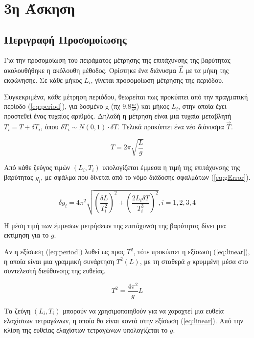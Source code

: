 \documentclass[assignment1.tex]{subfiles}
\begin{document}
\section*{3η Άσκηση}


\subsection{Περιγραφή Προσομοίωσης}
Για την προσομοίωση του πειράματος μέτρησης της επιτάχυνσης της βαρύτητας ακολουθήθηκε η ακόλουθη μέθοδος. Ορίστηκε ένα διάνυσμα $\vec{L}$ με τα μήκη της εκφώνησης. Σε κάθε μήκος $L_i$, γίνεται προσομοίωση μέτρησης της περιόδου. 

Συγκεκριμένα, κάθε μέτρηση περιόδου, θεωρείται πως προκύπτει από την πραγματική περίοδο (\ref{eq:period}), για δοσμένο \textlatin{g} (πχ $9.8\frac{m}{s^2}$) και μήκος $L_i$, στην οποία έχει προστεθεί ένας τυχαίος αριθμός. Δηλαδή η μέτρηση είναι μια τυχαία μεταβλητή $T_i = T + \delta T_i$, όπου $\delta T_i \sim N(0,1)\cdot \delta T$. Τελικά προκύπτει ένα νέο διάνυσμα $\vec{T}$.

\begin{equation}
T = 2\pi \sqrt{\frac{L}{g}}
\label{eq:period}
\end{equation}

Από κάθε ζεύγος τιμών $(L_i, T_i)$ υπολογίζεται έμμεσα η τιμή της επιτάχυνσης της βαρύτητας $g_i$, με σφάλμα που δίνεται από το νόμο διάδοσης σφαλμάτων (\ref{eq:gError}).

\begin{equation}
\delta g_i = 4\pi^2 \sqrt{\left(\frac{\delta L}{T_i^2}\right)^2 + \left(\frac{2L_i\delta T}{T_i^3}\right)^2}, i=1,2,3,4
\label{eq:gError}
\end{equation}

Η μέση τιμή των έμμεσων μετρήσεων της επιτάχυνση της βαρύτητας δίνει μια εκτίμηση για το $g$.

Αν η εξίσωση (\ref{eq:period}) λυθεί ως προς $T^2$, τότε προκύπτει η εξίσωση (\ref{eq:linear}), η οποία είναι μια γραμμική συνάρτηση $T^2(L)$, με τη σταθερά $g$ κρυμμένη μέσα στο συντελεστή διεύθυνσης της ευθείας. 

\begin{equation}
T^2 = \frac{4\pi^2}{g}L
\label{eq:linear}
\end{equation}

Τα ζεύγη $(L_i, T_i)$ μπορούν να χρησιμοποιηθούν για να χαραχτεί μια ευθεία ελαχίστων τετραγώνων, η οποία θα είναι κοντά στην εξίσωση (\ref{eq:linear}). Από την κλίση της ευθείας ελαχίστων τετραγώνων υπολογίζεται το $g$.
\end{document}
